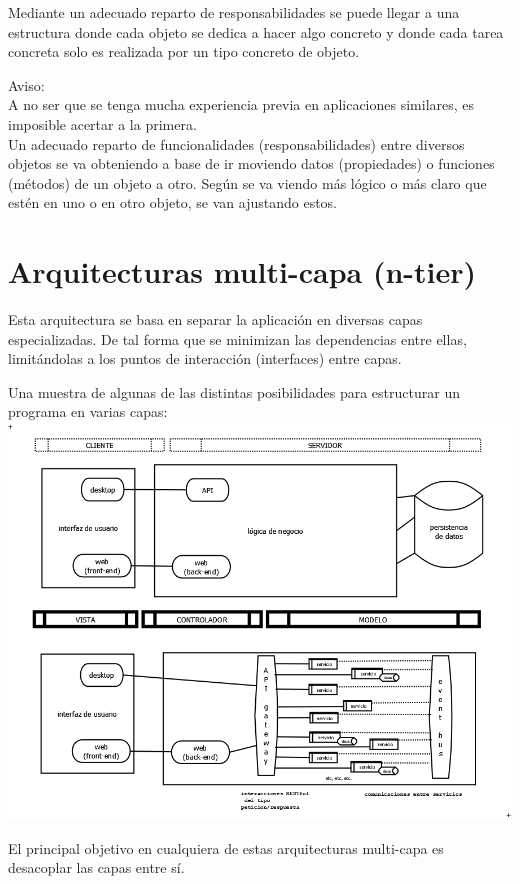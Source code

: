 \documentclass[spanish,12pt,a4paper,final,oneside]{book}
\begin{document}
Mediante un adecuado reparto de responsabilidades se puede llegar a una estructura donde cada objeto se dedica a hacer algo concreto y donde cada tarea concreta solo es realizada por un tipo concreto de objeto.

Aviso: 
\\A no ser que se tenga mucha experiencia previa en aplicaciones similares, es imposible acertar a la primera. 
\\Un adecuado reparto de funcionalidades (responsabilidades) entre diversos objetos se va obteniendo a base de ir moviendo datos (propiedades) o funciones (métodos) de un objeto a otro. Según se va viendo más lógico o más claro que estén en uno o en otro objeto, se van ajustando estos.


\section{Arquitecturas multi-capa (n-tier)}\label{multicapa}
Esta arquitectura se basa en separar la aplicación en diversas capas especializadas. De tal forma que se minimizan las dependencias entre ellas, limitándolas a los puntos de interacción (interfaces) entre capas.

Una muestra de algunas de las distintas posibilidades para estructurar un programa en varias capas:
\\ \includegraphics[width=1.1\textwidth]{arquitecturas multicapa}

El principal objetivo en cualquiera de estas arquitecturas multi-capa es desacoplar las capas entre sí.
\end{document}
